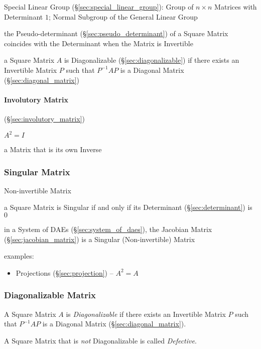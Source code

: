 \fist Special Linear Group (\S\ref{sec:special_linear_group}): Group of $n
\times n$ Matrices with Determinant $1$; Normal Subgroup of the General Linear
Group

the Pseudo-determinant (\S\ref{sec:pseudo_determinant}) of a Square Matrix
coincides with the Determinant when the Matrix is Invertible

a Square Matrix $A$ is Diagonalizable (\S\ref{sec:diagonalizable}) if there
exists an Invertible Matrix $P$ such that $P^{-1}AP$ is a Diagonal Matrix
(\S\ref{sec:diagonal_matrix})



\paragraph{Involutory Matrix} (\S\ref{sec:involutory_matrix})\hfill

$A^2 = I$

a Matrix that is its own Inverse



\subsubsection{Singular Matrix}\label{sec:singular_matrix}

Non-invertible Matrix

a Square Matrix is Singular if and only if its Determinant
(\S\ref{sec:determinant}) is $0$

\fist in a System of DAEs (\S\ref{sec:system_of_daes}), the Jacobian Matrix
(\S\ref{sec:jacobian_matrix}) is a Singular (Non-invertible) Matrix

examples:
\begin{itemize}
  \item Projections (\S\ref{sec:projection}) -- $A^2 = A$
\end{itemize}



\subsubsection{Diagonalizable Matrix}\label{sec:diagonalizable_matrix}

A Square Matrix $A$ is \emph{Diagonalizable} if there exists an Invertible
Matrix $P$ such that $P^{-1}AP$ is a Diagonal Matrix
(\S\ref{sec:diagonal_matrix}).

A Square Matrix that is \emph{not} Diagonalizable is called \emph{Defective}.

